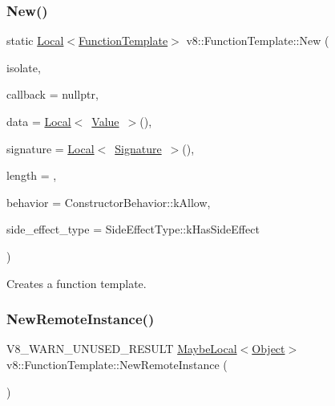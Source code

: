 \subsubsection{\texorpdfstring{New()}{New()}}
{\footnotesize\ttfamily static \mbox{\hyperlink{classv8_1_1Local}{Local}}$<$\mbox{\hyperlink{classv8_1_1FunctionTemplate}{Function\+Template}}$>$ v8\+::\+Function\+Template\+::\+New (\begin{DoxyParamCaption}\item[{Isolate $\ast$}]{isolate,  }\item[{Function\+Callback}]{callback = {\ttfamily nullptr},  }\item[{\mbox{\hyperlink{classv8_1_1Local}{Local}}$<$ \mbox{\hyperlink{classv8_1_1Value}{Value}} $>$}]{data = {\ttfamily \mbox{\hyperlink{classv8_1_1Local}{Local}}$<$~\mbox{\hyperlink{classv8_1_1Value}{Value}}~$>$()},  }\item[{\mbox{\hyperlink{classv8_1_1Local}{Local}}$<$ \mbox{\hyperlink{classv8_1_1Signature}{Signature}} $>$}]{signature = {\ttfamily \mbox{\hyperlink{classv8_1_1Local}{Local}}$<$~\mbox{\hyperlink{classv8_1_1Signature}{Signature}}~$>$()},  }\item[{int}]{length = {},  }\item[{Constructor\+Behavior}]{behavior = {\ttfamily ConstructorBehavior\+:\+:kAllow},  }\item[{\mbox{\hyperlink{namespacev8_a29711319c2b9fc7716d65faee2f7b9cb}{Side\+Effect\+Type}}}]{side\+\_\+effect\+\_\+type = {\ttfamily SideEffectType\+:\+:kHasSideEffect} }\end{DoxyParamCaption})\hspace{0.3cm}{\ttfamily [static]}}

Creates a function template. \mbox{\label{classv8_1_1FunctionTemplate_a06fffd3d45d4f2f1aec8df075961af59}} 
\subsubsection{\texorpdfstring{New\+Remote\+Instance()}{NewRemoteInstance()}}
{\footnotesize\ttfamily V8\+\_\+\+W\+A\+R\+N\+\_\+\+U\+N\+U\+S\+E\+D\+\_\+\+R\+E\+S\+U\+LT \mbox{\hyperlink{classv8_1_1MaybeLocal}{Maybe\+Local}}$<$\mbox{\hyperlink{classv8_1_1Object}{Object}}$>$ v8\+::\+Function\+Template\+::\+New\+Remote\+Instance (\begin{DoxyParamCaption}{ }\end{DoxyParamCaption})}


